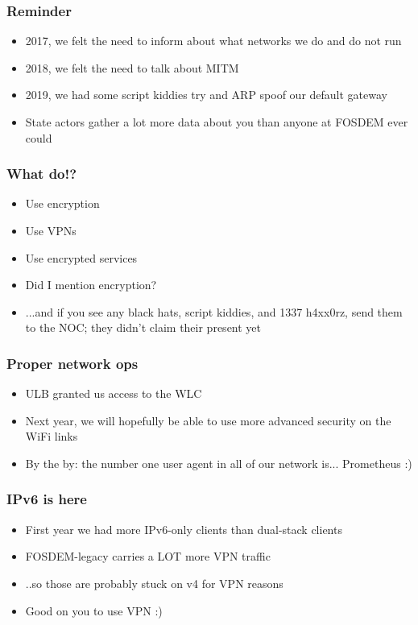 \documentclass[aspectratio=169]{beamer}
\begin{document}
\begin{frame}
	\frametitle{Reminder}
	\vfill
	\begin{itemize}
		\item 2017, we felt the need to inform about what networks we do and do not run
		\item 2018, we felt the need to talk about MITM
		\item 2019, we had some script kiddies try and ARP spoof our default gateway
		\item State actors gather a lot more data about you than anyone at FOSDEM ever could
	\end{itemize}
	\vfill
\end{frame}

\begin{frame}
	\frametitle{What do!?}
	\vfill
	\begin{itemize}
		\item Use encryption
		\item Use VPNs
		\item Use encrypted services
		\item Did I mention encryption?
		\item ...and if you see any black hats, script kiddies, and 1337 h4xx0rz, send them to the NOC; they didn't claim their present yet
	\end{itemize}
	\vfill
\end{frame}

\begin{frame}
	\frametitle{Proper network ops}
	\vfill
	\begin{itemize}
		\item ULB granted us access to the WLC
		\item Next year, we will hopefully be able to use more advanced security on the WiFi links
		\item By the by: the number one user agent in all of our network is... Prometheus :)
	\end{itemize}
	\vfill
\end{frame}

\begin{frame}
	\frametitle{IPv6 is here}
	\vfill
	\begin{itemize}
		\item First year we had more IPv6-only clients than dual-stack clients
		\item FOSDEM-legacy carries a LOT more VPN traffic
		\item ..so those are probably stuck on v4 for VPN reasons
		\item Good on you to use VPN :)
	\end{itemize}
	\vfill
\end{frame}
\end{document}
